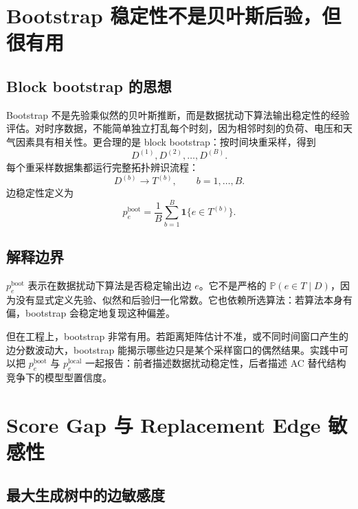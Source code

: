 \documentclass[UTF8,12pt,openany]{ctexrep}
\numberwithin{equation}{chapter}
\theoremstyle{definition}
\theoremstyle{plain}
\newcommand{\Prob}{\mathbb{P}}
\newcommand{\ind}[1]{\mathbf{1}\{#1\}}
\begin{document}
\chapter{Bootstrap 稳定性不是贝叶斯后验，但很有用}

\section{Block bootstrap 的思想}

Bootstrap 不是先验乘似然的贝叶斯推断，而是数据扰动下算法输出稳定性的经验评估。对时序数据，不能简单独立打乱每个时刻，因为相邻时刻的负荷、电压和天气因素具有相关性。更合理的是 block bootstrap：按时间块重采样，得到
\begin{equation}
D^{(1)},D^{(2)},\ldots,D^{(B)}.
\label{eq:block-bootstrap-data}
\end{equation}
每个重采样数据集都运行完整拓扑辨识流程：
\begin{equation}
D^{(b)}\to T^{(b)},\qquad b=1,\ldots,B.
\label{eq:bootstrap-pipeline}
\end{equation}
边稳定性定义为
\begin{equation}
p_e^{\mathrm{boot}}
=
\frac{1}{B}
\sum_{b=1}^{B}
\ind{e\in T^{(b)}}.
\label{eq:bootstrap-edge-stability}
\end{equation}

\section{解释边界}

$p_e^{\mathrm{boot}}$ 表示在数据扰动下算法是否稳定输出边 $e$。它不是严格的 $\Prob(e\in T\mid D)$，因为没有显式定义先验、似然和后验归一化常数。它也依赖所选算法：若算法本身有偏，bootstrap 会稳定地复现这种偏差。

但在工程上，bootstrap 非常有用。若距离矩阵估计不准，或不同时间窗口产生的边分数波动大，bootstrap 能揭示哪些边只是某个采样窗口的偶然结果。实践中可以把 $p_e^{\mathrm{boot}}$ 与 $p_e^{\mathrm{local}}$ 一起报告：前者描述数据扰动稳定性，后者描述 AC 替代结构竞争下的模型型置信度。

\chapter{Score Gap 与 Replacement Edge 敏感性}

\section{最大生成树中的边敏感度}
\end{document}
